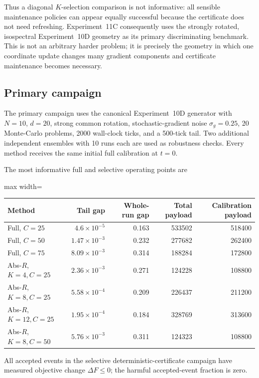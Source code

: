 Thus a diagonal $K$-selection comparison is not informative: all sensible maintenance policies can appear equally successful because the certificate does not need refreshing. Experiment~11C consequently uses the strongly rotated, isospectral Experiment~10D geometry as its primary discriminating benchmark. This is not an arbitrary harder problem; it is precisely the geometry in which one coordinate update changes many gradient components and certificate maintenance becomes necessary.

\subsection{Primary campaign}

The primary campaign uses the canonical Experiment~10D generator with $N=10$, $d=20$, strong common rotation, stochastic-gradient noise $\sigma_g=0.25$, 20 Monte-Carlo problems, 2000 wall-clock ticks, and a 500-tick tail. Two additional independent ensembles with 10 runs each are used as robustness checks. Every method receives the same initial full calibration at $t=0$.

The most informative full and selective operating points are
\begin{center}
\begin{adjustbox}{max width=\textwidth}
\begin{tabular}{lrrrr}
\toprule
Method & Tail gap & Whole-run gap & Total payload & Calibration payload \\
\midrule
Full, $C=25$ & $4.6\times10^{-5}$ & 0.163 & 533502 & 518400 \\
Full, $C=50$ & $1.47\times10^{-3}$ & 0.232 & 277682 & 262400 \\
Full, $C=75$ & $8.09\times10^{-3}$ & 0.314 & 188284 & 172800 \\
Abs-$R$, $K=4,C=25$ & $2.36\times10^{-3}$ & 0.271 & 124228 & 108800 \\
Abs-$R$, $K=8,C=25$ & $5.58\times10^{-4}$ & 0.209 & 226437 & 211200 \\
Abs-$R$, $K=12,C=25$ & $1.95\times10^{-4}$ & 0.184 & 328769 & 313600 \\
Abs-$R$, $K=8,C=50$ & $5.76\times10^{-3}$ & 0.311 & 124323 & 108800 \\
\bottomrule
\end{tabular}
\end{adjustbox}
\end{center}
All accepted events in the selective deterministic-certificate campaign have measured objective change $\Delta F\leq0$; the harmful accepted-event fraction is zero.

